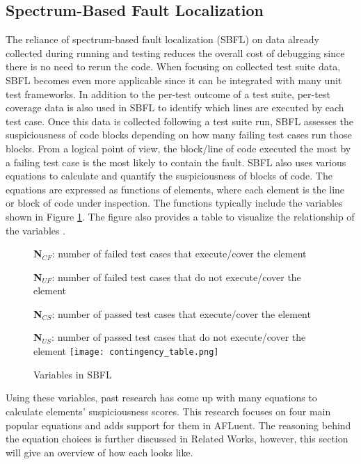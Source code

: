 \subsection{Spectrum-Based Fault Localization}
\label{subsec:SpectrumBased}

The reliance of spectrum-based fault localization (SBFL) on data already
collected during running and testing reduces the overall cost of debugging since
there is no need to rerun the code. When focusing on collected test suite data,
SBFL becomes even more applicable since it can be integrated with many unit test
frameworks. In addition to the per-test outcome of a test suite, per-test
coverage data is also used in SBFL to identify which lines are executed by each
test case. Once this data is collected following a test suite run, SBFL assesses
the suspiciousness of code blocks depending on how many failing test cases run
those blocks. From a logical point of view, the block/line of code executed the
most by a failing test case is the most likely to contain the fault. SBFL also
uses various equations to calculate and quantify the
suspiciousness of blocks of code. The equations are expressed as functions of
elements, where each element is the line or block of code under inspection. The
functions typically include the variables shown in
Figure \ref{fig:contingency_table}. The figure also provides a table to visualize
the relationship of the variables \cite{Wong2014DStar}.

\begin{figure}[!htb]
	\begin{center}
		\textbf{N$_{CF}$}: number of failed test cases that execute/cover the element

		\textbf{N$_{UF}$}: number of failed test cases that do not execute/cover the element

		\textbf{N$_{CS}$}: number of passed test cases that execute/cover the element

		\textbf{N$_{US}$}: number of passed test cases that do not execute/cover the element
		\texttt{[image: contingency\_table.png]}
		\caption{\label{fig:contingency_table} Variables in SBFL}
	\end{center}
\end{figure}

Using these variables, past research has come up with many equations to
calculate elements' suspiciousness scores. This research focuses on four main
popular equations and adds support for them in AFLuent. The reasoning behind the
equation choices is further discussed in Related Works, however, this section
will give an overview of how each looks like.

